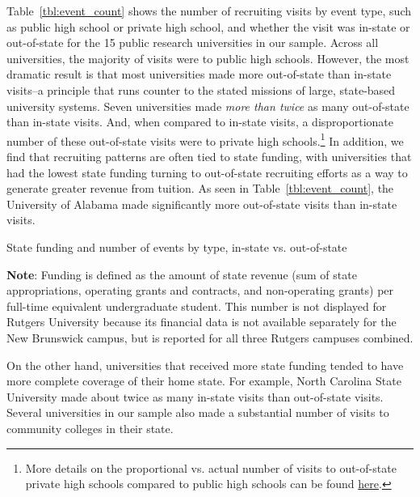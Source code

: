 \documentclass{article}
\begin{document}
Table~\ref{tbl:event_count} shows the number of recruiting visits by event type, such as public high school or private high school, and whether the visit was in-state or out-of-state for the 15 public research universities in our sample. Across all universities, the majority of visits were to public high schools. However, the most dramatic result is that most universities made more out-of-state than in-state visits--a principle that runs counter to the stated missions of large, state-based university systems. Seven universities made \textit{more than twice} as many out-of-state than in-state visits. And, when compared to in-state visits, a disproportionate number of these out-of-state visits were to private high schools.\footnote{More details on the proportional vs. actual number of visits to out-of-state private high schools compared to public high schools can be found \href{https://emraresearch.org/sites/default/files/2019-03/joyce_report.pdf\#page=34}{here}.} In addition, we find that recruiting patterns are often tied to state funding, with universities that had the lowest state funding turning to out-of-state recruiting efforts as a way to generate greater revenue from tuition. As seen in Table~\ref{tbl:event_count}, the University of Alabama made significantly more out-of-state visits than in-state visits.

\renewcommand{\arraystretch}{1.5}%
\begin{table}[!ht]
    \caption{State funding and number of events by type, in-state vs. out-of-state}\label{tbl:event_count}
    \vspace{0.5cm}
    \fontsize{6}{7}\selectfont{}
    
    \begin{flushleft}\textbf{Note}: Funding is defined as the amount of state revenue (sum of state appropriations, operating grants and contracts, and non-operating grants) per full-time equivalent undergraduate student. This number is not displayed for Rutgers University because its financial data is not available separately for the New Brunswick campus, but is reported for all three Rutgers campuses combined.\end{flushleft}
\end{table}

On the other hand, universities that received more state funding tended to have more complete coverage of their home state. For example, North Carolina State University made about twice as many in-state visits than out-of-state visits. Several universities in our sample also made a substantial number of visits to community colleges in their state. 
\end{document}
